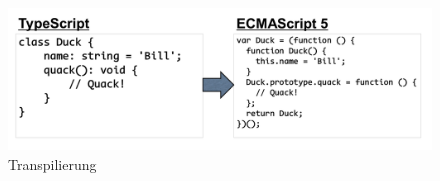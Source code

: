 \begin{figure}[ht]
 \centering
 \includegraphics[width=0.8\linewidth]{kapitel2/Introduction-transpiler.png}
 \caption{Transpilierung \cite[27]{ng-Book-2}}
\end{figure}
